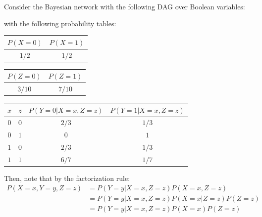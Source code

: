 \documentclass{article}
\begin{document}
\clearpage
\problem{}
Consider the Bayesian network with the following DAG over Boolean variables:
\begin{center}
\end{center}
with the following probability tables:
\begin{center}
\begin{tabular}{|c|c|}
    \hline
    $P(X = 0)$ & $P(X = 1)$ \\
    \hline
    $1/2$ & $1/2$ \\
    \hline
\end{tabular}
\begin{tabular}{|c|c|}
    \hline
    $P(Z = 0)$ & $P(Z = 1)$ \\
    \hline
    $3/10$ & $7/10$ \\
    \hline
\end{tabular}
\end{center}
\begin{center}
\begin{tabular}{|c|c|c|c|}
    \hline
    $x$ & $z$ & $P(Y = 0 | X = x, Z = z)$ & $P(Y = 1 | X = x, Z = z)$ \\
    \hline
    $0$ & $0$ & $2/3$ & $1/3$ \\
    \hline
    $0$ & $1$ & $0$ & $1$ \\
    \hline
    $1$ & $0$ & $2/3$ & $1/3$ \\
    \hline
    $1$ & $1$ & $6/7$ & $1/7$ \\
    \hline
\end{tabular}
\end{center}
Then, note that by the factorization rule:
\begin{align*}
    P(X = x, Y = y, Z = z) & = P(Y = y | X = x, Z = z)P(X = x, Z = z) \\
    & = P(Y = y | X = x, Z = z)P(X = x | Z = z)P(Z = z) \\
    & = P(Y = y | X = x, Z = z)P(X = x)P(Z = z) \\
\end{align*}
\end{document}
